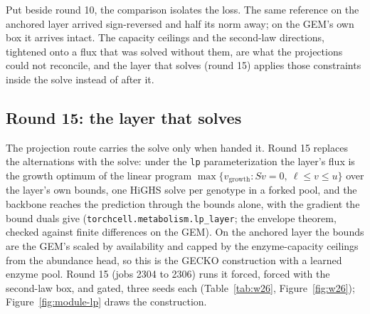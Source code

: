 Put beside round 10, the comparison isolates the loss. The same reference on the
anchored layer arrived sign-reversed and half its norm away; on the GEM's own box it
arrives intact. The capacity ceilings and the second-law directions, tightened onto a
flux that was solved without them, are what the projections could not reconcile, and
the layer that solves (round 15) applies those constraints inside the solve instead of
after it.

\subsection{Round 15: the layer that solves}

The projection route carries the solve only when handed it. Round 15 replaces the
alternations with the solve: under the \texttt{lp} parameterization the layer's flux is
the growth optimum of the linear program $\max\{v_{\text{growth}} : Sv = 0,\ \ell \le v
\le u\}$ over the layer's own bounds, one HiGHS solve per genotype in a forked pool, and
the backbone reaches the prediction through the bounds alone, with the gradient the
bound duals give (\texttt{torchcell.metabolism.lp\_layer}; the envelope theorem, checked
against finite differences on the GEM). On the anchored layer the bounds are the GEM's
scaled by availability and capped by the enzyme-capacity ceilings from the abundance
head, so this is the GECKO construction with a learned enzyme pool. Round 15 (jobs 2304
to 2306) runs it forced, forced with the second-law box, and gated, three seeds each
(Table~\ref{tab:w26}, Figure~\ref{fig:w26}); Figure~\ref{fig:module-lp} draws the
construction.






